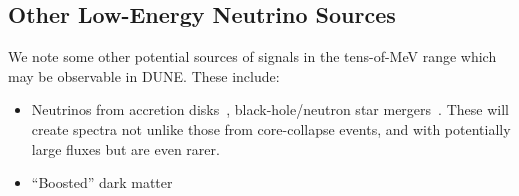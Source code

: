 \subsection{Other Low-Energy Neutrino Sources}

We note some other potential sources of signals in the tens-of-MeV range which may be observable in DUNE.  These include:
\begin{itemize}
\item Neutrinos from accretion disks~\cite{Caballero:2011dw}, black-hole/neutron star mergers~\cite{Caballero:2009ww}.  These will create spectra not unlike those from core-collapse events, and with potentially large fluxes but are even rarer.
\item ``Boosted'' dark matter

\end{itemize}

